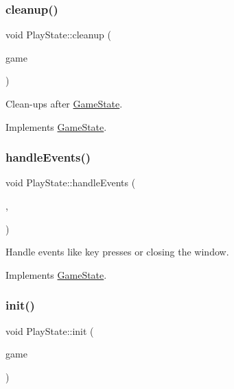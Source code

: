 \subsubsection{\texorpdfstring{cleanup()}{cleanup()}}
{\footnotesize\ttfamily void Play\+State\+::cleanup (\begin{DoxyParamCaption}\item[{\mbox{\hyperlink{class_game_engine}{Game\+Engine}} $\ast$}]{game }\end{DoxyParamCaption})\hspace{0.3cm}{\ttfamily [virtual]}}



Clean-\/ups after \mbox{\hyperlink{class_game_state}{Game\+State}}. 



Implements \mbox{\hyperlink{class_game_state_a7df4ea0b4815d2b3b35dbec2a399a0b6}{Game\+State}}.

\mbox{\label{class_play_state_acdb47d9367dac45893eb9c9a45390385}} 
\subsubsection{\texorpdfstring{handleEvents()}{handleEvents()}}
{\footnotesize\ttfamily void Play\+State\+::handle\+Events (\begin{DoxyParamCaption}\item[{\mbox{\hyperlink{class_game_engine}{Game\+Engine}} $\ast$}]{,  }\item[{sf\+::\+Event}]{ }\end{DoxyParamCaption})\hspace{0.3cm}{\ttfamily [virtual]}}



Handle events like key presses or closing the window. 



Implements \mbox{\hyperlink{class_game_state_a3ef0638514dbfe71581d593cf0f66ce5}{Game\+State}}.

\mbox{\label{class_play_state_ae5761f09579d0f1800253764f2d68218}} 
\subsubsection{\texorpdfstring{init()}{init()}}
{\footnotesize\ttfamily void Play\+State\+::init (\begin{DoxyParamCaption}\item[{\mbox{\hyperlink{class_game_engine}{Game\+Engine}} $\ast$}]{game }\end{DoxyParamCaption})\hspace{0.3cm}{\ttfamily [virtual]}}



